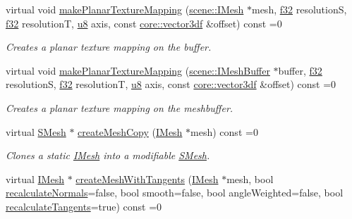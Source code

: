 \begin{DoxyCompactItemize}
virtual void \hyperlink{classirr_1_1scene_1_1IMeshManipulator_abc1b4ae56f126e8466ba6f6634a0f723}{make\+Planar\+Texture\+Mapping} (\hyperlink{classirr_1_1scene_1_1IMesh}{scene\+::\+I\+Mesh} $\ast$mesh, \hyperlink{namespaceirr_a0277be98d67dc26ff93b1a6a1d086b07}{f32} resolutionS, \hyperlink{namespaceirr_a0277be98d67dc26ff93b1a6a1d086b07}{f32} resolutionT, \hyperlink{namespaceirr_a646874f69af8ff87fc10201b0254a761}{u8} axis, const \hyperlink{namespaceirr_1_1core_ae6e2b2a6c552833ebbd5b7463d03586b}{core\+::vector3df} \&offset) const =0
\begin{DoxyCompactList}\small\item\em Creates a planar texture mapping on the buffer. \end{DoxyCompactList}\item 
virtual void \hyperlink{classirr_1_1scene_1_1IMeshManipulator_a28c9aaddc04baa710138a065457f9df1}{make\+Planar\+Texture\+Mapping} (\hyperlink{classirr_1_1scene_1_1IMeshBuffer}{scene\+::\+I\+Mesh\+Buffer} $\ast$buffer, \hyperlink{namespaceirr_a0277be98d67dc26ff93b1a6a1d086b07}{f32} resolutionS, \hyperlink{namespaceirr_a0277be98d67dc26ff93b1a6a1d086b07}{f32} resolutionT, \hyperlink{namespaceirr_a646874f69af8ff87fc10201b0254a761}{u8} axis, const \hyperlink{namespaceirr_1_1core_ae6e2b2a6c552833ebbd5b7463d03586b}{core\+::vector3df} \&offset) const =0
\begin{DoxyCompactList}\small\item\em Creates a planar texture mapping on the meshbuffer. \end{DoxyCompactList}\item 
virtual \hyperlink{structirr_1_1scene_1_1SMesh}{S\+Mesh} $\ast$ \hyperlink{classirr_1_1scene_1_1IMeshManipulator_a3d2e7401f1d43919834a1bfe0b65e77f}{create\+Mesh\+Copy} (\hyperlink{classirr_1_1scene_1_1IMesh}{I\+Mesh} $\ast$mesh) const =0
\begin{DoxyCompactList}\small\item\em Clones a static \hyperlink{classirr_1_1scene_1_1IMesh}{I\+Mesh} into a modifiable \hyperlink{structirr_1_1scene_1_1SMesh}{S\+Mesh}. \end{DoxyCompactList}\item 
virtual \hyperlink{classirr_1_1scene_1_1IMesh}{I\+Mesh} $\ast$ \hyperlink{classirr_1_1scene_1_1IMeshManipulator_ab849bd2c83b206de1e5da19ce3481e35}{create\+Mesh\+With\+Tangents} (\hyperlink{classirr_1_1scene_1_1IMesh}{I\+Mesh} $\ast$mesh, bool \hyperlink{classirr_1_1scene_1_1IMeshManipulator_a8dba16b7eedeac07761c9c1247944429}{recalculate\+Normals}=false, bool smooth=false, bool angle\+Weighted=false, bool \hyperlink{classirr_1_1scene_1_1IMeshManipulator_a0ea43e8c4e8489551228b3005d325cd6}{recalculate\+Tangents}=true) const =0

\end{DoxyCompactItemize}
